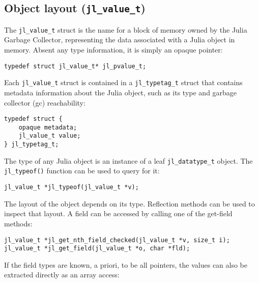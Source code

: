 \hypertarget{9050896398576860708}{}


\subsection{Object layout (\texttt{jl\_value\_t})}



The \texttt{jl\_value\_t} struct is the name for a block of memory owned by the Julia Garbage Collector, representing the data associated with a Julia object in memory. Absent any type information, it is simply an opaque pointer:




\begin{lstlisting}
typedef struct jl_value_t* jl_pvalue_t;
\end{lstlisting}



Each \texttt{jl\_value\_t} struct is contained in a \texttt{jl\_typetag\_t} struct that contains metadata information about the Julia object, such as its type and garbage collector (gc) reachability:




\begin{lstlisting}
typedef struct {
    opaque metadata;
    jl_value_t value;
} jl_typetag_t;
\end{lstlisting}



The type of any Julia object is an instance of a leaf \texttt{jl\_datatype\_t} object. The \texttt{jl\_typeof()} function can be used to query for it:




\begin{lstlisting}
jl_value_t *jl_typeof(jl_value_t *v);
\end{lstlisting}



The layout of the object depends on its type. Reflection methods can be used to inspect that layout. A field can be accessed by calling one of the get-field methods:




\begin{lstlisting}
jl_value_t *jl_get_nth_field_checked(jl_value_t *v, size_t i);
jl_value_t *jl_get_field(jl_value_t *o, char *fld);
\end{lstlisting}



If the field types are known, a priori, to be all pointers, the values can also be extracted directly as an array access:




